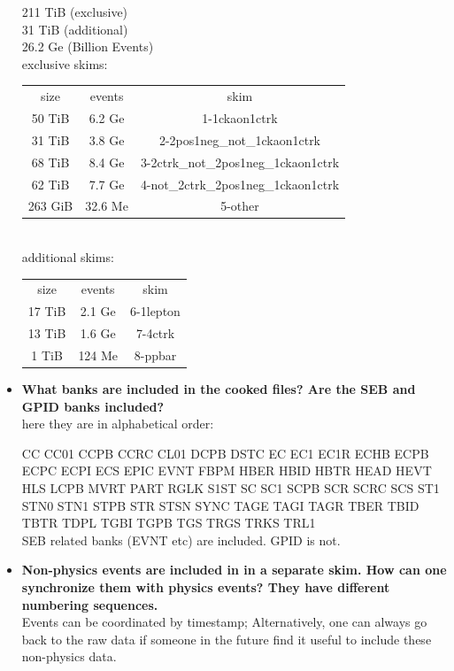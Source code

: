 \documentclass[ 12 pt]{article}
\begin{document}
\begin{itemize}
211 TiB (exclusive)\\
31 TiB (additional)\\
26.2 Ge (Billion Events)\\
exclusive skims:\\
\begin{tabular}{ c c c }
size	     &      events	&     skim\\
50 TiB	 &    6.2 Ge	&    1-1ckaon1ctrk\\
31 TiB	 &    3.8 Ge	&    2-2pos1neg\_not\_1ckaon1ctrk \\
68 TiB	 &    8.4 Ge	&    3-2ctrk\_not\_2pos1neg\_1ckaon1ctrk \\
62 TiB	 &    7.7 Ge	&    4-not\_2ctrk\_2pos1neg\_1ckaon1ctrk \\
263 GiB &	32.6 Me &	   5-other
\end{tabular}
\\
additional skims:\\
\begin{tabular}{ c c c }
size     &	events  &	skim\\
17 TiB &	2.1 Ge  &	6-1lepton\\
13 TiB &	1.6 Ge  &	7-4ctrk\\
1 TiB	& 124 Me & 	8-ppbar\\
\end{tabular}

\item \textbf{What banks are included in the cooked files? Are the SEB and GPID banks 
included?}\\

here they are in alphabetical order:

CC CC01 CCPB CCRC CL01 DCPB DSTC EC EC1 EC1R ECHB ECPB ECPC ECPI ECS EPIC EVNT FBPM HBER HBID HBTR HEAD HEVT HLS LCPB MVRT PART RGLK S1ST SC SC1 SCPB SCR SCRC SCS ST1 STN0 STN1 STPB STR STSN SYNC TAGE TAGI TAGR TBER TBID TBTR TDPL TGBI TGPB TGS TRGS TRKS TRL1\\
SEB related banks (EVNT etc) are included. GPID is not.


\item \textbf{Non-physics events are included in in a separate skim. How can one 
synchronize them with physics events? They have different numbering 
sequences.}\\
Events can be coordinated by timestamp; Alternatively, one can always go back to the raw data if someone in the future find it useful to include these non-physics data.



\end{itemize}
\end{document}
